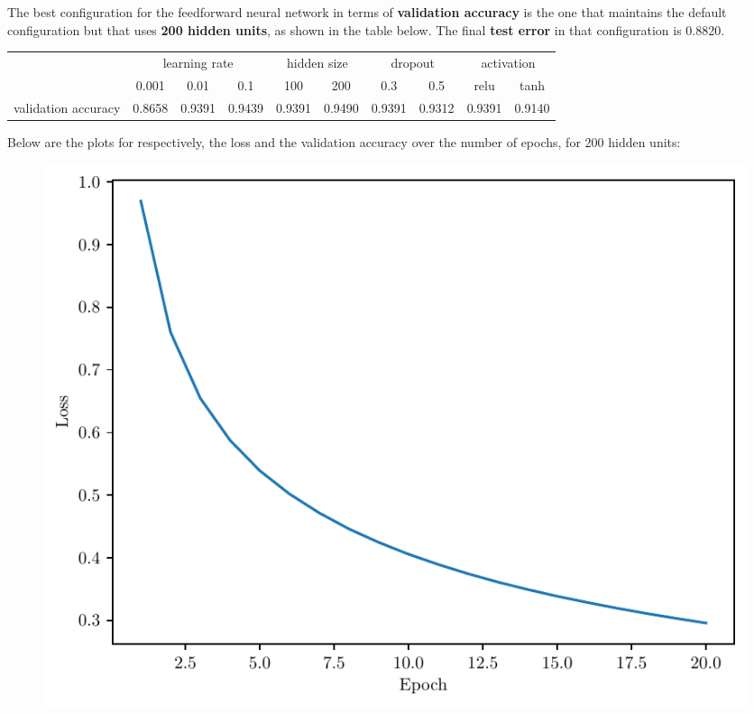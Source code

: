 \begin{questions}
        \question %
        The best configuration for the feedforward neural network in terms of \textbf{validation accuracy}
        is the one that maintains the default configuration but that uses \textbf{200 hidden units}, 
        as shown in the table below. The final \textbf{test error} in that configuration is 0.8820.
        \begin{table}[h!]
            \centering
            \begin{tabular}{c|ccc|cc|cc|cc}
                                & \multicolumn{3}{c|}{learning rate}                            & \multicolumn{2}{c|}{hidden size} & \multicolumn{2}{c|}{dropout}     & \multicolumn{2}{c}{activation}   \\ \cline{2-10} 
                                & \multicolumn{1}{c|}{0.001} & \multicolumn{1}{c|}{0.01} & 0.1  & \multicolumn{1}{c|}{100}  & 200  & \multicolumn{1}{c|}{0.3}  & 0.5  & \multicolumn{1}{c|}{relu} & tanh \\ \hline
            validation accuracy & \multicolumn{1}{c|}{0.8658} & \multicolumn{1}{c|}{0.9391} & 0.9439 & \multicolumn{1}{c|}{0.9391} & 0.9490 & \multicolumn{1}{c|}{0.9391} & 0.9312 & \multicolumn{1}{c|}{0.9391} & 0.9140
            \end{tabular}
        \end{table}
        
        \newpage

        Below are the plots for respectively, the loss and the validation accuracy over the number of epochs,
        for 200 hidden units:

        \begin{figure}[H]
            \centering
            \includegraphics[scale = 0.75]{feedforward-training-loss-0.01-200-1-0.3-relu-sgd-16.pdf}
        \end{figure}


\end{questions}
